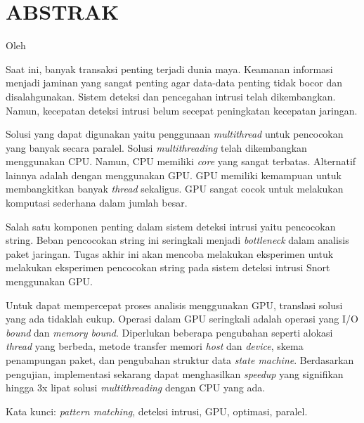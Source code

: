 \chapter*{ABSTRAK}

\begin{center}
\MakeTextUppercase{\textbf{\large{\thetitle}}}

Oleh

\MakeTextUppercase{\theauthor}
\end{center}
\medskip
\begin{spacing}{1.0}

Saat ini, banyak transaksi penting terjadi dunia maya. Keamanan informasi menjadi jaminan yang sangat penting agar data-data penting tidak bocor dan disalahgunakan. Sistem deteksi dan pencegahan intrusi telah dikembangkan. Namun, kecepatan deteksi intrusi belum secepat peningkatan kecepatan jaringan.

Solusi yang dapat digunakan yaitu penggunaan \emph{multithread} untuk pencocokan yang banyak secara paralel. Solusi \emph{multithreading} telah dikembangkan menggunakan CPU. Namun, CPU memiliki \emph{core} yang sangat terbatas. Alternatif lainnya adalah dengan menggunakan GPU. GPU memiliki kemampuan untuk membangkitkan banyak \emph{thread} sekaligus. GPU sangat cocok untuk melakukan komputasi sederhana dalam jumlah besar. 

Salah satu komponen penting dalam sistem deteksi intrusi yaitu pencocokan string. Beban pencocokan string ini seringkali menjadi \emph{bottleneck} dalam analisis paket jaringan. Tugas akhir ini akan mencoba melakukan eksperimen untuk melakukan eksperimen pencocokan string pada sistem deteksi intrusi Snort menggunakan GPU.

Untuk dapat mempercepat proses analisis menggunakan GPU, translasi solusi yang ada tidaklah cukup. Operasi dalam GPU seringkali adalah operasi yang I/O \emph{bound} dan \emph{memory bound}. Diperlukan beberapa pengubahan seperti alokasi \emph{thread} yang berbeda, metode transfer memori \emph{host} dan \emph{device}, skema penampungan paket, dan pengubahan struktur data \emph{state machine}. Berdasarkan pengujian, implementasi sekarang dapat menghasilkan \emph{speedup} yang signifikan hingga 3x lipat solusi \emph{multithreading} dengan CPU yang ada.

Kata kunci: \textit{pattern matching}, deteksi intrusi, GPU, optimasi, paralel.


\end{spacing}

\clearpage